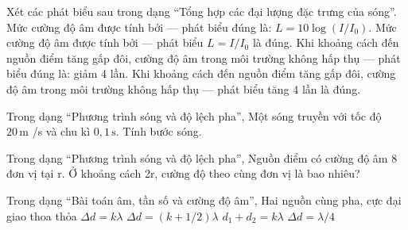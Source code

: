 \begin{ex}
Xét các phát biểu sau trong dạng “Tổng hợp các đại lượng đặc trưng của sóng”.
\choiceTF
{\True Mức cường độ âm được tính bởi — phát biểu đúng là: $L=10\log(I/I_0)$.}
{Mức cường độ âm được tính bởi — phát biểu $L=I/I_0$ là đúng.}
{\True Khi khoảng cách đến nguồn điểm tăng gấp đôi, cường độ âm trong môi trường không hấp thụ — phát biểu đúng là: giảm 4 lần.}
{Khi khoảng cách đến nguồn điểm tăng gấp đôi, cường độ âm trong môi trường không hấp thụ — phát biểu tăng 4 lần là đúng.}
\end{ex}

\begin{bt}
Trong dạng “Phương trình sóng và độ lệch pha”, Một sóng truyền với tốc độ $20\,\text{m}$ /s và chu kì $0,1\,\text{s}$. Tính bước sóng.
\end{bt}

\begin{ex}
Trong dạng “Phương trình sóng và độ lệch pha”, Nguồn điểm có cường độ âm 8 đơn vị tại r. Ở khoảng cách 2r, cường độ theo cùng đơn vị là bao nhiêu?
\end{ex}

\begin{ex}
Trong dạng “Bài toán âm, tần số và cường độ âm”, Hai nguồn cùng pha, cực đại giao thoa thỏa
\choice
{\True $\Delta d=k\lambda$}
{$\Delta d=(k+1/2)\lambda$}
{$d_1+d_2=k\lambda$}
{$\Delta d=\lambda/4$}
\end{ex}

